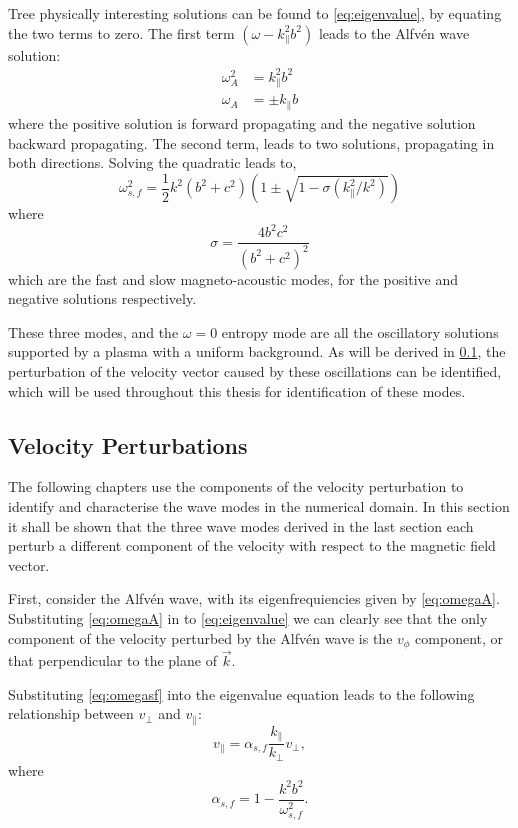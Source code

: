 Tree physically interesting solutions can be found to \cref{eq:eigenvalue}, by equating the two terms to zero.
The first term $(\omega - k_\parallel^2 b^2)$ leads to the Alfv\'en wave solution:
\begin{align}
\omega^2_A &= k^2_\parallel b^2\\
\omega_A &= \pm k_\parallel b
\label{eq:omegaA}
\end{align}
where the positive solution is forward propagating and the negative solution backward propagating.
The second term, leads to two solutions, propagating in both directions. Solving the quadratic leads to,
\begin{equation}
    \omega^2_{s,f} = \frac{1}{2}k^2(b^2+c^2)\left(1 \pm \sqrt{1 - \sigma (k^2_\parallel/k^2)}\right)
    \label{eq:omegasf}
\end{equation}
where
\begin{equation}
    \sigma=\frac{4b^2c^2}{(b^2 + c^2)^2}
    \label{eq:sigmasf}
\end{equation}
which are the fast and slow magneto-acoustic modes, for the positive and negative solutions respectively.

These three modes, and the $\omega = 0$ entropy mode are all the oscillatory solutions supported by a plasma with a uniform background.
As will be derived in \cref{sec:Vpert}, the perturbation of the velocity vector caused by these oscillations can be identified, which will be used throughout this thesis for identification of these modes.


\subsection{Velocity Perturbations}\label{sec:Vpert}

The following chapters use the components of the velocity perturbation to identify and characterise the wave modes in the numerical domain.
In this section it shall be shown that the three wave modes derived in the last section each perturb a different component of the velocity with respect to the magnetic field vector.

First, consider the Alfv\'en wave, with its eigenfrequiencies given by \cref{eq:omegaA}.
Substituting \cref{eq:omegaA} in to \cref{eq:eigenvalue} we can clearly see that the only component of the velocity perturbed by the Alfv\'en wave is the $v_\phi$ component, or that perpendicular to the plane of $\vec{k}$.

Substituting \cref{eq:omegasf} into the eigenvalue equation leads to the following relationship between $v_\perp$ and $v_\parallel$:
\begin{equation}
    v_\parallel = \alpha_{s,f} \frac{k_\parallel}{k_\perp}v_\perp,
    \label{eq:vyvz}
\end{equation}
where
\begin{equation}
    \alpha_{s,f} = 1 - \frac{k^2b^2}{\omega^2_{s,f}}.
    \label{eq:alphasf}
\end{equation}

